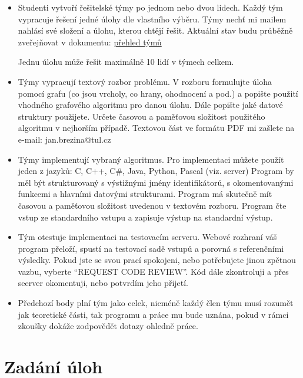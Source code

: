 \documentclass[a4paper,10pt]{article}
\begin{document}
  \begin{itemize}
  \item   Studenti vytvoří řešitelské týmy po jednom nebo dvou lidech. Každý tým vypracuje řešení jedné úlohy dle vlastního výběru. Týmy nechť mi mailem nahlásí své složení a úlohu, kterou chtějí řešit.  Aktuální stav budu průběžně zveřejňovat v dokumentu:
 \href{https://docs.google.com/spreadsheets/d/1351X8wRr24RCTDonNWbDcbJwNYJDtrtG3udH7RnDAjA}{přehled týmů}
 
 Jednu úlohu může řešit maximálně 10 lidí v týmech celkem.

  \item Týmy vypracují textový rozbor problému. V rozboru formulujte úloha  pomocí grafu (co jsou vrcholy, co hrany, ohodnocení a pod.)
  a popište použití vhodného grafového algoritmu pro danou úlohu. Dále popište jaké datové struktury použijete. 
  Určete časovou a paměťovou složitost použitého algoritmu v nejhorším případě. 
  Textovou část ve formátu PDF mi zašlete na e-mail: jan.brezina@tul.cz 
         

  \item  Týmy implementují vybraný algoritmus. Pro implementaci můžete použít jeden z jazyků: C, C++, C\#, Java, Python, Pascal (viz. server)
   Program by měl být strukturovaný s výstižnými jmény identifikátorů, s okomentovanými funkcemi a hlavními datovými strukturami. 
   Program má skutečně mít časovou a paměťovou složitost uvedenou v textovém rozboru. Program čte vstup ze standardního vstupu a zapisuje výstup na standardní výstup.
  
  \item  Tým otestuje implementaci na testovacím serveru. Webové rozhraní váš program přeloží, 
        spustí na testovací sadě vstupů a porovná s referenčními výsledky. Pokud jste se svou prací spokojeni, nebo potřebujete jinou zpětnou vazbu, vyberte ``REQUEST CODE REVIEW''. Kód dále zkontroluji a přes seerver okomentuji, nebo potvrdím jeho přijetí.

  \item  Předchozí body plní tým jako celek, nicméně každý člen týmu musí rozumět jak teoretické části, tak programu a práce mu bude uznána, pokud v rámci zkoušky dokáže zodpovědět dotazy ohledně práce.
 \end{itemize}

\section{Zadání úloh}
\end{document}

